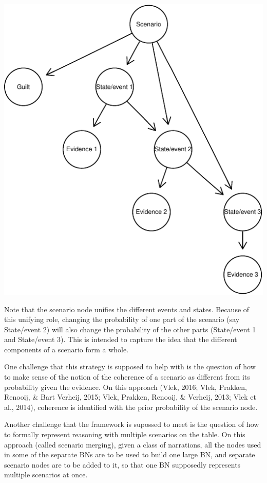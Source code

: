 \documentclass[11pt,dvipsnames,enabledeprecatedfontcommands]{scrartcl}
\begin{document}
\begin{center}\includegraphics{BNfiles/unnamed-chunk-13-1} \end{center}

\noindent
 Note that the scenario node unifies the different events and states.
Because of this unifying role, changing the probability of one part of
the scenario (say \textsf{State/event 2}) will also change the
probability of the other parts (\textsf{State/event 1} and
\textsf{State/event 3}). This is intended to capture the idea that the
different components of a scenario form a whole.

One challenge that this strategy is supposed to help with is the
question of how to make sense of the notion of the coherence of a
scenario as different from its probability given the evidence. On this
approach (Vlek, 2016; Vlek, Prakken, Renooij, \& Bart Verheij, 2015;
Vlek, Prakken, Renooij, \& Verheij, 2013; Vlek et al., 2014), coherence
is identified with the prior probability of the scenario node.

Another challenge that the framework is supossed to meet is the question
of how to formally represent reasoning with multiple scenarios on the
table. On this approach (called scenario merging), given a class of
narrations, all the nodes used in some of the separate BNs are to be
used to build one large BN, and separate scenario nodes are to be added
to it, so that one BN supposedly represents multiple scenarios at once.
\end{document}
